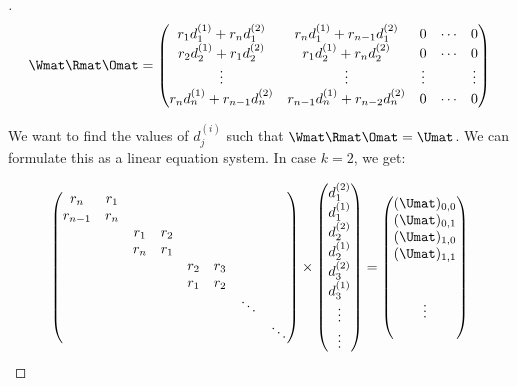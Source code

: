 \begin{proof}[]
\begin{equation}
  \Wmat\Rmat\Omat = \leftmatrix
  r_{1} d_{1}^{(1)} + r_{n}   d_{1}^{(2)} & r_{n}   d_{1}^{(1)} + r_{n-1} d_{1}^{(2)} & 0 & \cdots & 0 \\
  r_{2} d_{2}^{(1)} + r_{1}   d_{2}^{(2)} & r_{1}   d_{2}^{(1)} + r_{n}   d_{2}^{(2)} & 0 & \cdots & 0 \\
  \vdots & \vdots & \vdots &  & \vdots \\
  r_{n} d_{n}^{(1)} + r_{n-1} d_{n}^{(2)} & r_{n-1} d_{n}^{(1)} + r_{n-2} d_{n}^{(2)} & 0 & \cdots & 0
  \rightmatrix
\end{equation}

\noindent
We want to find the values of $d_{j}^{(i)}$ such that $\Wmat \Rmat \Omat = \Umat$.
We can formulate this as a linear equation system.
In case $k=2$, we get:

\begin{equation}
  \leftmatrix
  r_{n} & r_{1}\\
  r_{n-1} & r_{n}\\
   &  & r_{1} & r_{2}\\
   &  & r_{n} & r_{1}\\
   &  &  &  & r_{2} & r_{3}\\
   &  &  &  & r_{1} & r_{2}\\
   &  &  &  &  &  & \ddots\\
   &  &  &  &  &  &  & \ddots
  \rightmatrix \times \leftmatrix
  d_{1}^{(2)} \\
  d_{1}^{(1)} \\
  d_{2}^{(2)} \\
  d_{2}^{(1)} \\
  d_{3}^{(2)} \\
  d_{3}^{(1)} \\
  \vdots\\
  \vdots
  \rightmatrix = \leftmatrix
  (\Umat)_{0,0} \\
  (\Umat)_{0,1} \\
  (\Umat)_{1,0} \\
  (\Umat)_{1,1} \\
  \\
  \\
  \vdots\\
  \\
  \rightmatrix
\end{equation}


\end{proof}
